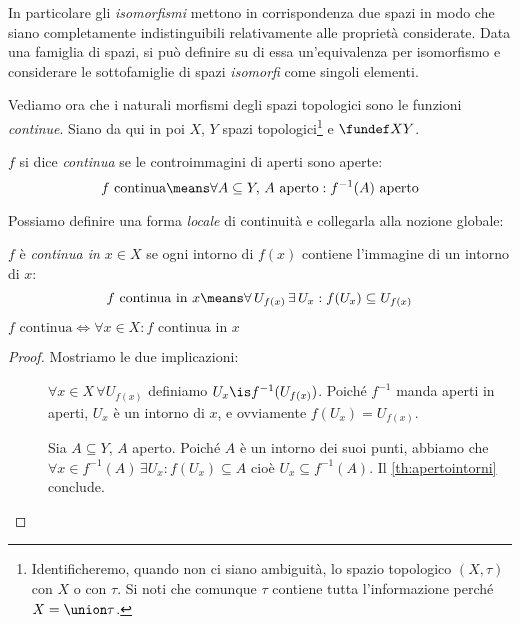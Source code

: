 In particolare gli \emph{isomorfismi} mettono in corrispondenza due spazi in modo che siano completamente indistinguibili relativamente alle proprietà considerate. Data una famiglia di spazi, si può definire su di essa un'equivalenza per isomorfismo e considerare le sottofamiglie di spazi \emph{isomorfi} come singoli elementi.

Vediamo ora che i naturali morfismi degli spazi topologici sono le funzioni \emph{continue}. Siano da qui in poi $X$, $Y$ spazi topologici\footnote{Identificheremo, quando non ci siano ambiguità, lo spazio topologico $(X,\tau)$ con $X$ o con $\tau$. Si noti che comunque $\tau$ contiene tutta l'informazione perché $X=\union\tau$.} e $\fundef XY$.

\begin{defn}[Continuità]
	$f$ si dice \emph{continua} se le controimmagini di aperti sono aperte:
	\[f\text{ continua}\means
	\forall A\subseteq Y,\,A\text{ aperto}:f^{-1}(A)\text{ aperto}\]
\end{defn}

Possiamo definire una forma \emph{locale} di continuità e collegarla alla nozione globale:

\begin{defn}
	$f$ è \emph{continua in $x\in X$} se ogni intorno di $f(x)$ contiene l'immagine di un intorno di $x$:
	\[f\text{ continua in }x\means
	\forall\, U_{f(x)}\,\exists\, U_x:f(U_x)\subseteq U_{f(x)}\]
\end{defn}

\begin{prop}
	$f\text{ continua}\iff\forall x\in X:f\text{ continua in }x$
\end{prop}

\begin{proof}
	Mostriamo le due implicazioni:
	\begin{description}
		\item[\proofrightarrow]
			$\forall x\in X\,\forall U_{f(x)}$ definiamo $U_x\is f^{-1}(U_{f(x)})$.
			Poiché $f^{-1}$ manda aperti in aperti, $U_x$ è un intorno di $x$,
			e ovviamente $f(U_x)=U_{f(x)}$.
		\item[\proofleftarrow]
			Sia  $A\subseteq Y$, $A$ aperto.
			Poiché $A$ è un intorno dei suoi punti, abbiamo che
			$\forall x\in f^{-1}(A)\,\exists U_x:f(U_x)\subseteq A$ cioè
			$U_x\subseteq f^{-1}(A)$.
			Il \autoref{th:apertointorni} conclude.
			\qedhere
	\end{description}
\end{proof}

